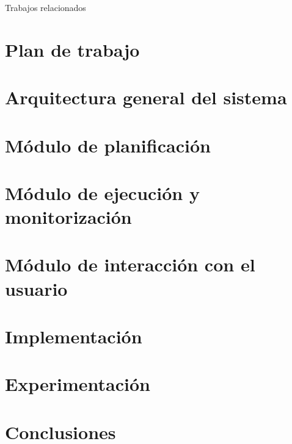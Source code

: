 \documentclass[11pt]{beamer}    %
\begin{document}
    \begin{frame}{Trabajos relacionados}

    \end{frame}

    \section{Plan de trabajo}
    \section{Arquitectura general del sistema}
    \section{Módulo de planificación}
    \section{Módulo de ejecución y monitorización}
    \section{Módulo de interacción con el usuario}
    \section{Implementación}
    \section{Experimentación}
    \section{Conclusiones}
\end{document}
